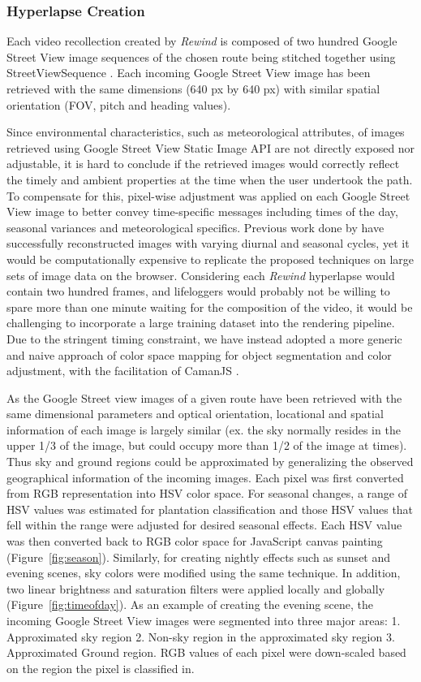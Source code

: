 \documentclass{sigchi}
\begin{document}
\subsubsection{Hyperlapse Creation} 
Each video recollection created by \textit{Rewind} is composed of two hundred Google Street View image sequences of the chosen route being stitched together using StreetViewSequence \cite{streetviewsequence}. Each incoming Google Street View image has been retrieved with the same dimensions (640 px by 640 px) with similar spatial orientation (FOV, pitch and heading values).

Since environmental characteristics, such as meteorological attributes, of images retrieved using Google Street View Static Image API are not directly exposed nor adjustable, it is hard to conclude if the retrieved images would correctly reflect the timely and ambient properties at the time when the user undertook the path. To compensate for this, pixel-wise adjustment was applied on each Google Street View image to better convey time-specific messages including times of the day, seasonal variances and meteorological specifics. Previous work done by \cite{laffont2014transient,shih2013data} have successfully reconstructed images with varying diurnal and seasonal cycles, yet it would be computationally expensive to replicate the proposed techniques on large sets of image data on the browser. Considering each \textit{Rewind} hyperlapse would contain two hundred frames, and lifeloggers would probably not be willing to spare more than one minute waiting for the composition of the video, it would be challenging to incorporate a large training dataset into the rendering pipeline. Due to the stringent timing constraint, we have instead adopted a more generic and naive approach of color space mapping for object segmentation and color adjustment, with the facilitation of CamanJS \cite{caman}.

As the Google Street view images of a given route have been retrieved with the same dimensional parameters and optical orientation, locational and spatial information of each image is largely similar (ex. the sky normally resides in the upper 1/3 of the image, but could occupy more than 1/2 of the image at times). Thus sky and ground regions could be approximated by generalizing the observed geographical information of the incoming images. Each pixel was first converted from RGB representation into HSV color space. For seasonal changes, a range of HSV values was estimated for plantation classification and those HSV values that fell within the range were adjusted for desired seasonal effects. Each HSV value was then converted back to RGB color space for JavaScript canvas painting (Figure~\ref{fig:season}). Similarly, for creating nightly effects such as sunset and evening scenes, sky colors were modified using the same technique. In addition, two linear brightness and saturation filters were applied locally and globally (Figure~\ref{fig:timeofday}). As an example of creating the evening scene, the incoming Google Street View images were segmented into three major areas: 1. Approximated sky region 2. Non-sky region in the approximated sky region 3. Approximated Ground region. RGB values of each pixel were down-scaled based on the region the pixel is classified in. 
\end{document}
